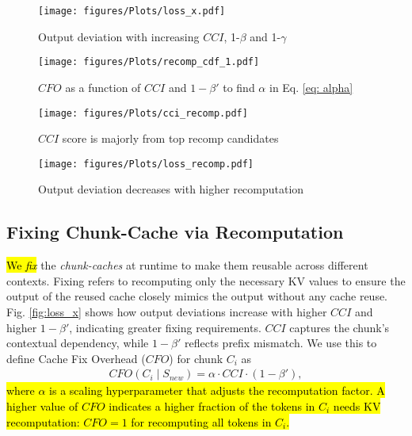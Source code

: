 \begin{figure}[t!]
    \centering
    \begin{minipage}[h!]{0.485\linewidth}
        \centering
        \texttt{[image: figures/Plots/loss\_x.pdf]}
        \caption{Output deviation with increasing $CCI$, 1-$\beta$ and 1-$\gamma$}
        \label{fig:loss_x}
    \end{minipage}
    \hfill
    \begin{minipage}[h!]{0.475\linewidth}
        \centering
        \texttt{[image: figures/Plots/recomp\_cdf\_1.pdf]}
        \caption{$CFO$ as a function of $CCI$ and $1-\beta'$ to find $\alpha$ in Eq. \ref{eq: alpha}}
        \label{fig:recomp_cfo}
    \end{minipage}
\end{figure}

\begin{figure}[t!]
    \centering
     \begin{minipage}[h!]{0.44\linewidth}
        \centering
        \texttt{[image: figures/Plots/cci\_recomp.pdf]}
        \caption{$CCI$ score is majorly from top recomp candidates}
        \label{fig:cci_tokens}
    \end{minipage}
    \hfill
    \begin{minipage}[h!]{0.475\linewidth}
        \centering
        \texttt{[image: figures/Plots/loss\_recomp.pdf]}
        \caption{Output deviation decreases with higher recomputation}
        \label{fig:loss_recomp}
    \end{minipage}
\end{figure}



\subsection{Fixing {Chunk-Cache} via Recomputation} \label{sec: fixing_recomputation}  
\hl{We \textit{fix}} the \textit{chunk-caches} at runtime to make them reusable across different contexts. 
Fixing refers to recomputing only the necessary KV values to ensure the output of the reused cache closely mimics the output without any cache reuse. Fig. \ref{fig:loss_x} shows how output deviations increase with higher $CCI$ and higher $1 - \beta'$, indicating greater fixing requirements. 
$CCI$ captures the chunk’s contextual dependency, while \(1 - \beta'\) reflects prefix mismatch. 
We use this to define Cache Fix Overhead ($CFO$) for chunk $C_i$ as
\begin{align}
\label{eq: alpha}
    CFO(C_i \mid S_{new}) = \alpha \cdot CCI \cdot (1 - \beta'),
\end{align}
\hl{where $\alpha$ is a scaling hyperparameter that adjusts the recomputation factor. A higher value of $CFO$ indicates a higher fraction of the tokens in $C_i$ needs KV recomputation: $CFO=1$ for recomputing all tokens in $C_i$.} 

